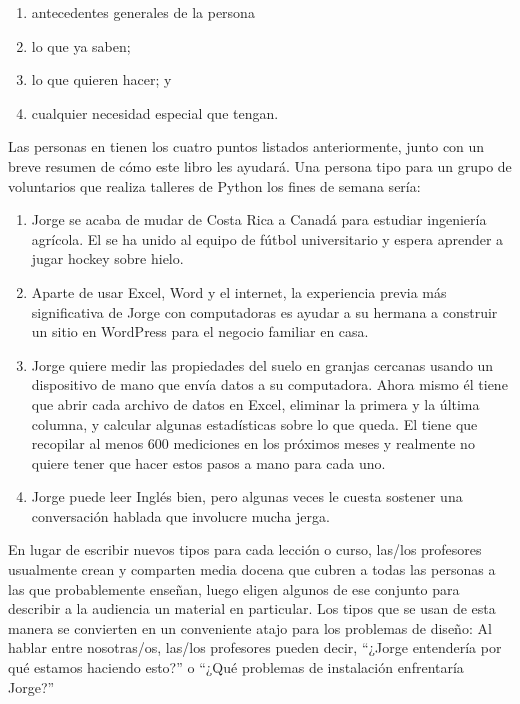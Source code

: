 \begin{enumerate}
 
\item
antecedentes generales de la persona
 
\item
lo que ya saben;
 
\item
lo que quieren hacer;
y
 
\item
cualquier necesidad especial que tengan.
 
\end{enumerate}
 Las personas en  tienen los cuatro puntos listados anteriormente,
junto con un breve resumen de cómo este libro les ayudará.
Una persona tipo para un grupo de voluntarios que realiza talleres de Python los fines de semana sería:
 
\begin{enumerate}
 
\item
 Jorge se acaba de mudar de Costa Rica a Canadá para estudiar ingeniería agrícola.
El se ha unido al equipo de fútbol universitario
y espera aprender a jugar hockey sobre hielo.
 
\item
Aparte de usar Excel, Word y el internet,
la experiencia previa más significativa de Jorge con computadoras
es ayudar a su hermana a construir un sitio en WordPress
para el negocio familiar en casa.
 
 
\item
  Jorge quiere medir las propiedades del suelo en granjas cercanas
usando un dispositivo de mano que envía datos a su computadora.
Ahora mismo él tiene que abrir cada archivo de datos en Excel,
eliminar la primera y la última columna,
y calcular algunas estadísticas sobre lo que queda.
El tiene que recopilar al menos 600 mediciones en los próximos meses
y realmente no quiere tener que hacer estos pasos a mano para cada uno.
 
\item
Jorge puede leer Inglés bien,
pero algunas veces le cuesta sostener una conversación hablada que involucre mucha jerga.
 
\end{enumerate}
 
En lugar de escribir nuevos tipos para cada lección o curso,
las/los profesores usualmente crean y comparten media docena
que cubren a todas las personas a las que probablemente enseñan,
luego eligen algunos de ese conjunto para describir a la audiencia un material en particular.
Los tipos que se usan de esta manera se convierten en un conveniente atajo para los problemas de diseño:
Al hablar entre nosotras/os,
las/los profesores pueden decir,
``¿Jorge entendería por qué estamos haciendo esto?''
o
``¿Qué problemas de instalación enfrentaría Jorge?''
 
